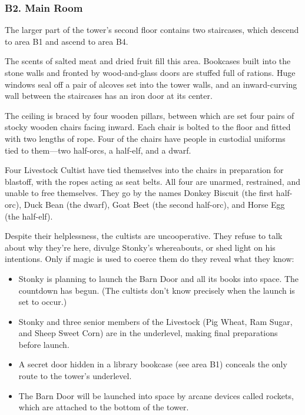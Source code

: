 \documentclass[10pt,a4paper,twoside,bg=print,twocolumn,openany,nodeprecatedcode]{dndbook}
\begin{document}
\subsubsection{B2. Main Room}
The larger part of the tower's second floor contains two staircases, which descend to area B1 and ascend to area B4.

\begin{DndReadAloud}{}
The scents of salted meat and dried fruit fill this area. Bookcases built into the stone walls and fronted by wood-and-glass doors are stuffed full of rations. Huge windows seal off a pair of alcoves set into the tower walls, and an inward-curving wall between the staircases has an iron door at its center.

The ceiling is braced by four wooden pillars, between which are set four pairs of stocky wooden chairs facing inward. Each chair is bolted to the floor and fitted with two lengths of rope. Four of the chairs have people in custodial uniforms tied to them—two half-orcs, a half-elf, and a dwarf.

\end{DndReadAloud}

Four Livestock Cultist have tied themselves into the chairs in preparation for blastoff, with the ropes acting as seat belts. All four are unarmed, restrained, and unable to free themselves. They go by the names Donkey Biscuit (the first half-orc), Duck Bean (the dwarf), Goat Beet (the second half-orc), and Horse Egg (the half-elf).

Despite their helplessness, the cultists are uncooperative. They refuse to talk about why they're here, divulge Stonky's whereabouts, or shed light on his intentions. Only if magic is used to coerce them do they reveal what they know:


\begin{itemize}
\item Stonky is planning to launch the Barn Door and all its books into space. The countdown has begun. (The cultists don't know precisely when the launch is set to occur.)
\item Stonky and three senior members of the Livestock (Pig Wheat, Ram Sugar, and Sheep Sweet Corn) are in the underlevel, making final preparations before launch.
\item A secret door hidden in a library bookcase (see area B1) conceals the only route to the tower's underlevel.
\item The Barn Door will be launched into space by arcane devices called rockets, which are attached to the bottom of the tower.
\end{itemize}
\end{document}
